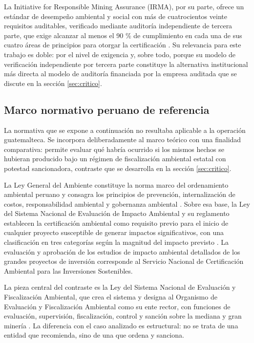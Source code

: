 La Initiative for Responsible Mining Assurance (IRMA), por su parte, ofrece un
estándar de desempeño ambiental y social con más de cuatrocientos veinte
requisitos auditables, verificado mediante auditoría independiente de tercera
parte, que exige alcanzar al menos el 90 \% de cumplimiento en cada una de sus
cuatro áreas de principios para otorgar la certificación
\parencite{irmasfstandard}. Su relevancia para este trabajo es doble: por el nivel
de exigencia y, sobre todo, porque su modelo de verificación independiente por
tercera parte constituye la alternativa institucional más directa al modelo de
auditoría financiada por la empresa auditada que se discute en la sección
\ref{sec:critico}.

\subsection{Marco normativo peruano de referencia}

La normativa que se expone a continuación no resultaba aplicable a la operación
guatemalteca. Se incorpora deliberadamente al marco teórico con una finalidad
comparativa: permite evaluar qué habría ocurrido si los mismos hechos se hubieran
producido bajo un régimen de fiscalización ambiental estatal con potestad
sancionadora, contraste que se desarrolla en la sección \ref{sec:critico}.

La Ley General del Ambiente constituye la norma marco del ordenamiento ambiental
peruano y consagra los principios de prevención, internalización de costos,
responsabilidad ambiental y gobernanza ambiental
\parencite{congreso2005ley28611}. Sobre esa base, la Ley del Sistema Nacional de
Evaluación de Impacto Ambiental y su reglamento establecen la certificación
ambiental como requisito previo para el inicio de cualquier proyecto susceptible
de generar impactos significativos, con una clasificación en tres categorías según
la magnitud del impacto previsto \parencite{congreso2001ley27446, minam2009ds019}.
La evaluación y aprobación de los estudios de impacto ambiental detallados de los
grandes proyectos de inversión corresponde al Servicio Nacional de Certificación
Ambiental para las Inversiones Sostenibles.

La pieza central del contraste es la Ley del Sistema Nacional de Evaluación y
Fiscalización Ambiental, que crea el sistema y designa al Organismo de Evaluación
y Fiscalización Ambiental como su ente rector, con funciones de evaluación,
supervisión, fiscalización, control y sanción sobre la mediana y gran minería
\parencite{congreso2009ley29325}. La diferencia con el caso analizado es
estructural: no se trata de una entidad que recomienda, sino de una que ordena y
sanciona.


